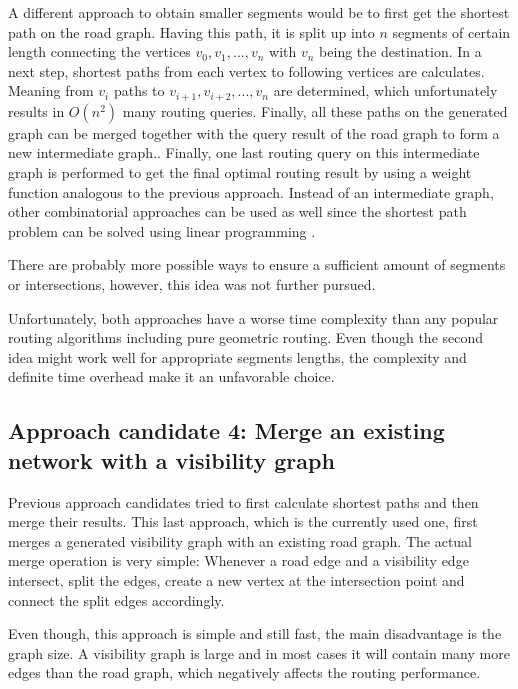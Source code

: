 		A different approach to obtain smaller segments would be to first get the shortest path on the road graph.
		Having this path, it is split up into $n$ segments of certain length connecting the vertices $v_0, v_1, ..., v_n$ with $v_n$ being the destination.
		In a next step, shortest paths from each vertex to following vertices are calculates.
		Meaning from $v_i$ paths to $v_{i+1}, v_{i+2}, ..., v_n$ are determined, which unfortunately results in $O(n^2)$ many routing queries.
		Finally, all these paths on the generated graph can be merged together with the query result of the road graph to form a new intermediate graph..
		Finally, one last routing query on this intermediate graph is performed to get the final optimal routing result by using a weight function analogous to the previous approach.
		Instead of an intermediate graph, other combinatorial approaches can be used as well since the shortest path problem can be solved using linear programming \cite{handler-zang-lp-duality}.
		
		There are probably more possible ways to ensure a sufficient amount of segments or intersections, however, this idea was not further pursued.
		
		Unfortunately, both approaches have a worse time complexity than any popular routing algorithms including pure geometric routing.
		Even though the second idea might work well for appropriate segments lengths, the complexity and definite time overhead make it an unfavorable choice.
	
	\subsection{Approach candidate 4: Merge an existing network with a visibility graph}
	
		Previous approach candidates tried to first calculate shortest paths and then merge their results.
		This last approach, which is the currently used one, first merges a generated visibility graph with an existing road graph.
		The actual merge operation is very simple:
		Whenever a road edge and a visibility edge intersect, split the edges, create a new vertex at the intersection point and connect the split edges accordingly.
		
		Even though, this approach is simple and still fast, the main disadvantage is the graph size.
		A visibility graph is large and in most cases it will contain many more edges than the road graph, which negatively affects the routing performance.
		
